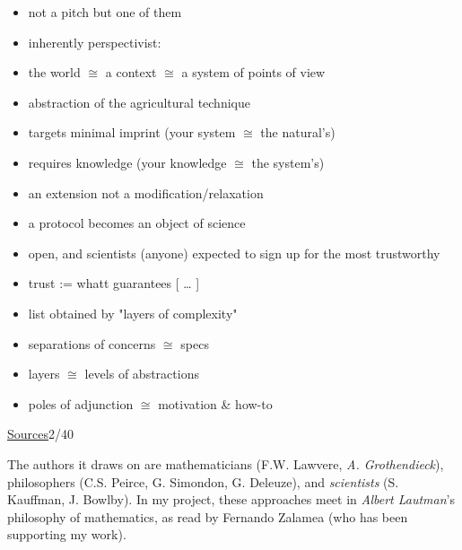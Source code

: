 \documentclass[a4paper,10pt]{article}
\newcommand{\slidehead}[2]{\par\addvspace{7pt}\noindent\underline{#1}\hfill{\color{gray}#2}\par\nopagebreak\vspace{1pt}}
\newcommand{\marked}[1]{\par\addvspace{2pt}{\bfseries #1}\par\nopagebreak}
\renewenvironment{leftbar}{%
  \def\FrameCommand{{\color{black!30}\vrule width 1.2pt}\hspace{6pt}}%
  \MakeFramed{\advance\hsize-\width \FrameRestore}}{\endMakeFramed}
\newenvironment{commentary}{\par\vspace{-2pt}\begin{leftbar}\color{black!80}}{\end{leftbar}}
\begin{document}
\begin{commentary}
\marked{\textcolor{hoapaviolet}{[…]}}
\begin{itemize}
\item not a pitch but one of them
\item inherently perspectivist:
\item the world \ensuremath{\cong} a context \ensuremath{\cong} a system of points of view
\end{itemize}
\marked{\textcolor{permaculturegreen}{Permacultural}}
\begin{itemize}
\item abstraction of the agricultural technique
\end{itemize}\vspace{2pt}
\begin{itemize}
\item targets minimal imprint (your system \ensuremath{\cong} the natural's)
\item requires knowledge (your knowledge \ensuremath{\cong} the system's)
\end{itemize}
\marked{\textcolor{scienceblue}{Scientific}}
\begin{itemize}
\item an extension not a modification/relaxation
\end{itemize}\vspace{2pt}
\begin{itemize}
\item a protocol becomes an object of science
\item open, and scientists (anyone) expected to sign up for the most trustworthy
\end{itemize}\vspace{2pt}
\begin{itemize}
\item trust := whatt guarantees [ … ]
\item list obtained by "layers of complexity"
\end{itemize}
\marked{Inventory diagram}
\begin{itemize}
\item separations of concerns \ensuremath{\cong} specs
\item layers \ensuremath{\cong} levels of abstractions
\item poles of adjunction \ensuremath{\cong} motivation \& how-to
\end{itemize}
\end{commentary}
\slidehead{Sources}{2/40}
The authors it draws on are mathematicians (F.W. Lawvere, \textcolor{risingseateal}{\emph{A. Grothendieck}}), philosophers (C.S. Peirce, G. Simondon, G. Deleuze), and \textcolor{scienceblue}{\emph{scientists}} (S. Kauffman, J. Bowlby). In my project, these approaches meet in \textcolor{metaphysicsamber}{\emph{Albert Lautman}}’s philosophy of mathematics, as read by Fernando Zalamea (who has been supporting my work).\par
\end{document}
